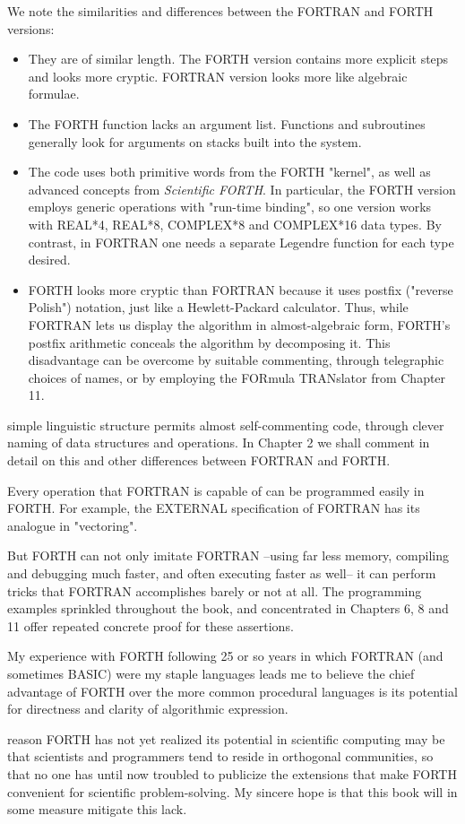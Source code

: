 We note the similarities and differences between the FORTRAN and FORTH versions:

\begin{itemize}
    \item They are of similar length. The FORTH version contains more explicit steps and looks more cryptic. FORTRAN version looks more like algebraic formulae.
    \item The FORTH function lacks an argument list. Functions and subroutines generally look for arguments on stacks built into the system.
    \item The code uses both primitive words from the FORTH "kernel", as well as advanced concepts from \textit{Scientific FORTH}. In particular, the FORTH version employs generic operations with "run-time binding", so one version works with REAL*4, REAL*8, COMPLEX*8 and COMPLEX*16 data types. By contrast, in FORTRAN one needs a separate Legendre function for each type desired.
    \item FORTH looks more cryptic than FORTRAN because it uses postfix ("reverse Polish") notation, just like a Hewlett-Packard calculator. Thus, while FORTRAN lets us display the algorithm in almost-algebraic form, FORTH's postfix arithmetic conceals the algorithm by decomposing it. This disadvantage can be overcome by suitable commenting, through telegraphic choices of names, or by employing the FORmula TRANslator from Chapter 11.
\end{itemize}

 simple linguistic structure permits almost self-commenting code, through clever naming of data structures and operations. In Chapter 2 we shall comment in detail on this and other differences between FORTRAN and FORTH.
 
Every operation that FORTRAN is capable of can be programmed easily in FORTH. For example, the EXTERNAL specification of FORTRAN has its analogue in "vectoring".

But FORTH can not only imitate FORTRAN --using far less memory, compiling and debugging much faster, and often executing faster as well-- it can perform tricks that FORTRAN accomplishes barely or not at all. The programming examples sprinkled throughout the book, and concentrated in Chapters 6, 8 and 11 offer repeated concrete proof for these assertions.

My experience with FORTH following 25 or so years in which FORTRAN (and sometimes BASIC) were my staple languages leads me to believe the chief advantage of FORTH over the more common procedural languages is its potential for directness and clarity of algorithmic expression.
 
 reason FORTH has not yet realized its potential in scientific computing may be that scientists and programmers tend to reside in orthogonal communities, so that no one has until now troubled to publicize the extensions that make FORTH convenient for scientific problem-solving. My sincere hope is that this book will in some measure mitigate this lack.

